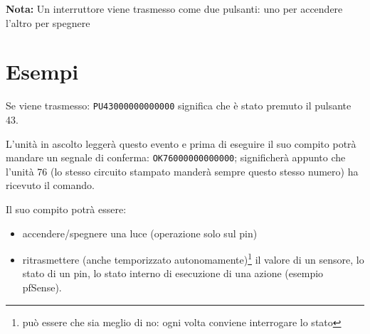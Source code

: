 \documentclass[italian]{article}
\begin{document}
    \textbf{Nota:} Un interruttore viene trasmesso come due pulsanti: uno per accendere l'altro per spegnere
    
    \section*{Esempi}
    
    Se viene trasmesso: \texttt{PU43000000000000} significa che è stato premuto il pulsante 43.
    
    L'unità in ascolto leggerà questo evento e prima di eseguire il suo compito  potrà mandare un segnale di conferma: \texttt{OK76000000000000}; significherà appunto che l'unità 76 (lo stesso circuito stampato manderà sempre questo stesso numero) ha ricevuto il comando.
    
    Il suo compito potrà essere:
    
    \begin{itemize}
        \item accendere/spegnere una luce (operazione solo sul pin)
        \item ritrasmettere (anche temporizzato autonomamente)\footnote{può essere che sia meglio di no: ogni volta conviene interrogare lo stato} il valore di un sensore, lo stato di un pin, lo stato interno di esecuzione di una azione (esempio pfSense).
    \end{itemize}
    
\end{document}
